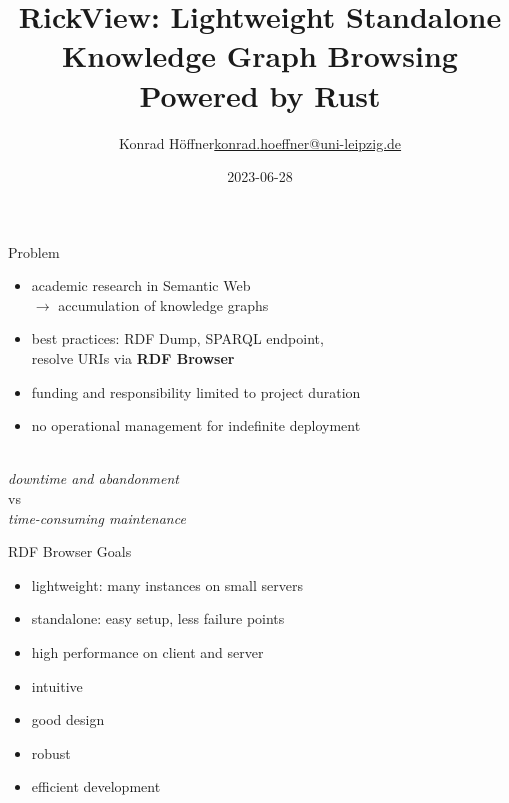 \documentclass[14pt,aspectratio=169]{beamer}
\date{2023-06-28}
\author{\texorpdfstring{Konrad Höffner\newline\url{konrad.hoeffner@uni-leipzig.de}}{Konrad Höffner}}
\title{RickView: Lightweight Standalone Knowledge Graph Browsing Powered by Rust}
\subtitle{}
\begin{document}
\begin{frame}
\titlepage
\end{frame}

\begin{frame}{Problem}
\begin{itemize}
\item academic research in Semantic Web\\$\rightarrow$ accumulation of knowledge graphs
\item best practices: RDF Dump, SPARQL endpoint,\\resolve URIs via \textbf{RDF Browser}
\pause
\item funding and responsibility limited to project duration 
\item no operational management for indefinite deployment
\pause
\end{itemize}
~\\
\centering
\emph{downtime and abandonment}\\
vs\\
\emph{time-consuming maintenance}
\end{frame}

\begin{frame}{RDF Browser Goals}
\begin{itemize}
\item lightweight: many instances on small servers
\item standalone: easy setup, less failure points
\item high performance on client and server
\pause
\item intuitive
\item good design
\item robust
\pause
\item efficient development
\end{itemize}
\end{frame}
\end{document}
